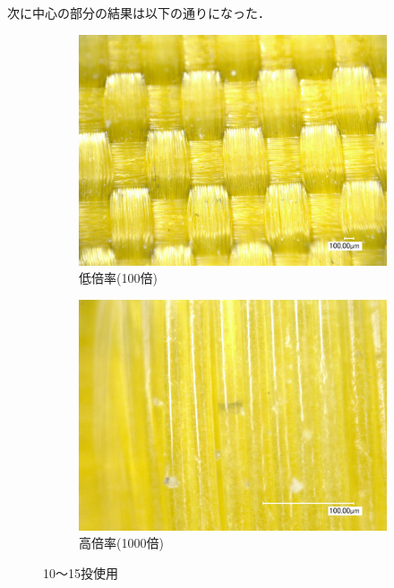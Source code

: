 \documentclass[main]{subfiles}
\begin{document}
次に中心の部分の結果は以下の通りになった．

\begin{figure}[H]
    \centering
    \begin{subfigure}[htbp]{0.45\linewidth}
        \centering
        \includegraphics[keepaspectratio, width=0.8\linewidth]{figures/中心/カーリングパッド10-15低倍率.jpg}
        \caption{低倍率(100倍)}
        \label{fig:label}
    \end{subfigure}
    \begin{subfigure}[htbp]{0.45\linewidth}
        \centering
        \includegraphics[keepaspectratio, width=0.8\linewidth]{figures/中心/カーリングパッド10-15.jpg}
        \caption{高倍率(1000倍)}
        \label{fig:label}
    \end{subfigure}
    \caption{10～15投使用}
    \label{fig:label}
\end{figure}
\end{document}
